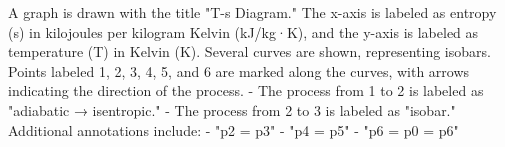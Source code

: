 A graph is drawn with the title "T-s Diagram." The x-axis is labeled as entropy (s) in kilojoules per kilogram Kelvin (kJ/kg·K), and the y-axis is labeled as temperature (T) in Kelvin (K). Several curves are shown, representing isobars. Points labeled 1, 2, 3, 4, 5, and 6 are marked along the curves, with arrows indicating the direction of the process.  
- The process from 1 to 2 is labeled as "adiabatic → isentropic."  
- The process from 2 to 3 is labeled as "isobar."  
Additional annotations include:  
- "p2 = p3"  
- "p4 = p5"  
- "p6 = p0 = p6"